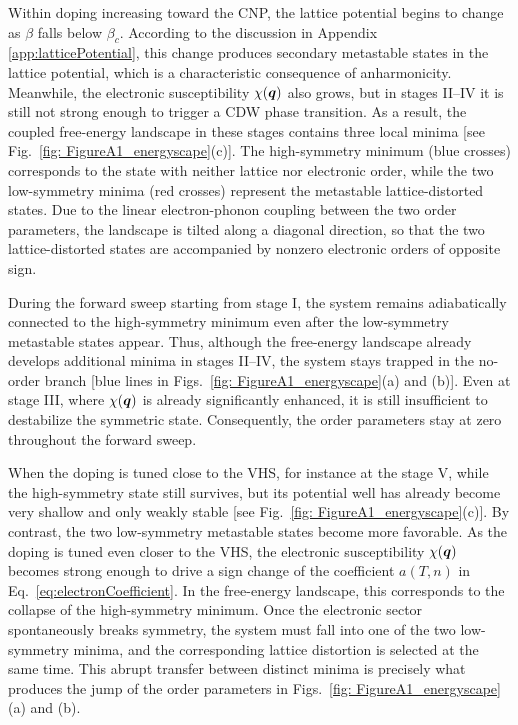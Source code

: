 \documentclass[aps,prx,article,twocolumn,amsmath,amssymb,superscriptaddress,longbibliography]{revtex4-2}
\begin{document}
Within doping increasing toward the CNP, the lattice potential begins to change as $\beta$ falls below $\beta_c$. According to the discussion in Appendix \ref{app:latticePotential}, this change produces secondary metastable states in the lattice potential, which is a characteristic consequence of anharmonicity. Meanwhile, the electronic susceptibility $\chi({\vb*{q}})$ also grows, but in stages II--IV it is still not strong enough to trigger a CDW phase transition. As a result, the coupled free-energy landscape in these stages contains three local minima [see Fig.~\ref{fig: FigureA1_energyscape}(c)]. The high-symmetry minimum (blue crosses) corresponds to the state with neither lattice nor electronic order, while the two low-symmetry minima (red crosses) represent the metastable lattice-distorted states. Due to the linear electron-phonon coupling between the two order parameters, the landscape is tilted along a diagonal direction, so that the two lattice-distorted states are accompanied by nonzero electronic orders of opposite sign.

During the forward sweep starting from stage I, the system remains adiabatically connected to the high-symmetry minimum even after the low-symmetry metastable states appear. Thus, although the free-energy landscape already develops additional minima in stages II--IV, the system stays trapped in the no-order branch [blue lines in Figs.~\ref{fig: FigureA1_energyscape}(a) and (b)]. Even at stage III, where $\chi({\vb*{q}})$ is already significantly enhanced, it is still insufficient to destabilize the symmetric state. Consequently, the order parameters stay at zero throughout the forward sweep.

When the doping is tuned close to the VHS, for instance at the stage V, while the high-symmetry state still survives, but its potential well has already become very shallow and only weakly stable [see Fig.~\ref{fig: FigureA1_energyscape}(c)]. By contrast, the two low-symmetry metastable states become more favorable. As the doping is tuned even closer to the VHS, the electronic susceptibility $\chi({\vb*{q}})$ becomes strong enough to drive a sign change of the coefficient $a(T,n)$ in Eq.~\eqref{eq:electronCoefficient}. In the free-energy landscape, this corresponds to the collapse of the high-symmetry minimum. Once the electronic sector spontaneously breaks symmetry, the system must fall into one of the two low-symmetry minima, and the corresponding lattice distortion is selected at the same time. This abrupt transfer between distinct minima is precisely what produces the jump of the order parameters in Figs.~\ref{fig: FigureA1_energyscape}(a) and (b).
\end{document}
